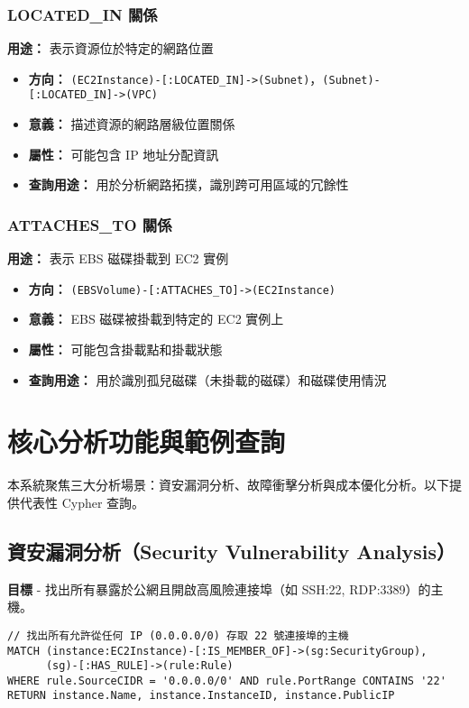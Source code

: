 \documentclass[11pt,a4paper]{ctexart}
\begin{document}
\subsubsection{LOCATED\_IN 關係}
\textbf{用途：} 表示資源位於特定的網路位置
\begin{itemize}[leftmargin=1.5em]
\item \textbf{方向：} \texttt{(EC2Instance)-[:LOCATED\_IN]->(Subnet)}，\texttt{(Subnet)-[:LOCATED\_IN]->(VPC)}
\item \textbf{意義：} 描述資源的網路層級位置關係
\item \textbf{屬性：} 可能包含 IP 地址分配資訊
\item \textbf{查詢用途：} 用於分析網路拓撲，識別跨可用區域的冗餘性
\end{itemize}

\subsubsection{ATTACHES\_TO 關係}
\textbf{用途：} 表示 EBS 磁碟掛載到 EC2 實例
\begin{itemize}[leftmargin=1.5em]
\item \textbf{方向：} \texttt{(EBSVolume)-[:ATTACHES\_TO]->(EC2Instance)}
\item \textbf{意義：} EBS 磁碟被掛載到特定的 EC2 實例上
\item \textbf{屬性：} 可能包含掛載點和掛載狀態
\item \textbf{查詢用途：} 用於識別孤兒磁碟（未掛載的磁碟）和磁碟使用情況
\end{itemize}


\section{核心分析功能與範例查詢}\label{sec:analysis}
本系統聚焦三大分析場景：資安漏洞分析、故障衝擊分析與成本優化分析。以下提供代表性 Cypher 查詢。

\subsection{資安漏洞分析（Security Vulnerability Analysis）}
\textbf{目標} - 找出所有暴露於公網且開啟高風險連接埠（如 SSH:22, RDP:3389）的主機。

\begin{lstlisting}[language=Cypher,caption={尋找允許 0.0.0.0/0 存取 22 埠之主機}]
// 找出所有允許從任何 IP (0.0.0.0/0) 存取 22 號連接埠的主機
MATCH (instance:EC2Instance)-[:IS_MEMBER_OF]->(sg:SecurityGroup),
      (sg)-[:HAS_RULE]->(rule:Rule)
WHERE rule.SourceCIDR = '0.0.0.0/0' AND rule.PortRange CONTAINS '22'
RETURN instance.Name, instance.InstanceID, instance.PublicIP
\end{lstlisting}
\end{document}

